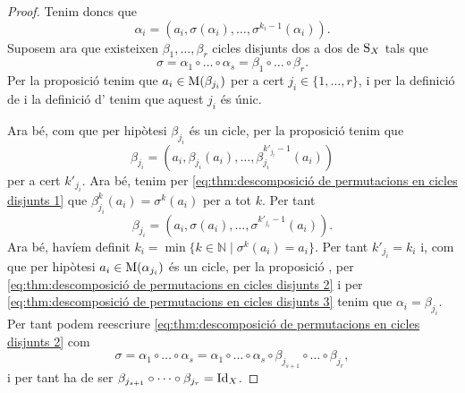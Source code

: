 \documentclass[../Apunts.tex]{subfiles}
\begin{document}
\begin{theorem}
\begin{proof}
			
			Tenim doncs que
			\begin{equation}
			\label{eq:thm:descomposició de permutacions en cicles disjunts 3}
			\alpha_{i}=\left(a_{i},\sigma(\alpha_{i}),\dots,\sigma^{k_{i}-1}(\alpha_{i})\right).
			\end{equation}
			Suposem ara que existeixen \(\beta_{1},\dots,\beta_{r}\) cicles disjunts dos a dos de \(\operatorname{S}_{X}\) tals que
			\begin{equation}
			\label{eq:thm:descomposició de permutacions en cicles disjunts 1}
			\sigma=\alpha_{1}\circ\dots\circ\alpha_{s}=\beta_{1}\circ\dots\circ\beta_{r}.
			\end{equation}
			Per la proposició  tenim que \(a_{i}\in\operatorname{M}(\beta_{j_{i}})\) per a cert \(j_{i}\in\{1,\dots,r\}\), i per la definició de  i la definició d' tenim que aquest \(j_{i}\) és únic.
			
			Ara bé, com que per hipòtesi \(\beta_{j_{i}}\) és un cicle, per la proposició  tenim que
			\[\beta_{j_{i}}=\left(a_{i},\beta_{j_{i}}(a_{i}),\dots,\beta^{k'_{j_{i}}-1}_{j_{i}}(a_{i})\right)\]
			per a cert \(k'_{j_{i}}\). Ara bé, tenim per \eqref{eq:thm:descomposició de permutacions en cicles disjunts 1} que \(\beta^{k}_{j_{i}}(a_{i})=\sigma^{k}(a_{i})\) per a tot \(k\). Per tant
			\[\beta_{j_{i}}=\left(a_{i},\sigma(a_{i}),\dots,\sigma^{k'_{j_{i}}-1}(a_{i})\right).\]
			Ara bé, havíem definit \(k_{i}=\min\{k\in\mathbb{N}\mid\sigma^{k}(a_{i})=a_{i}\}\). Per tant \(k'_{j_{i}}=k_{i}\) i, com que per hipòtesi \(a_{i}\in\operatorname{M}(\alpha_{j_{i}})\) és un cicle, per la proposició , per \eqref{eq:thm:descomposició de permutacions en cicles disjunts 2} i per \eqref{eq:thm:descomposició de permutacions en cicles disjunts 3} tenim que \(\alpha_{i}=\beta_{j_{i}}\). Per tant podem reescriure \eqref{eq:thm:descomposició de permutacions en cicles disjunts 2} com
			\[\sigma=\alpha_{1}\circ\dots\circ\alpha_{s}=\alpha_{1}\circ\dots\circ\alpha_{s}\circ\beta_{j_{s+1}}\circ\dots\circ\beta_{j_{r}},\]
			i per tant ha de ser \(\beta_{j_{s+1}}\circ\dots\circ\beta_{j_{r}}=\operatorname{Id}_{X}\).
		\end{proof}
	\end{theorem}
\end{document}
